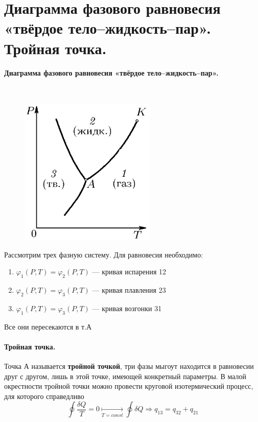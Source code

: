\section{\normalsize Диаграмма фазового равновесия «твёрдое тело--жидкость--пар». Тройная точка.}
\paragraph{Диаграмма фазового равновесия «твёрдое тело--жидкость--пар».}$\;$\\
\begin{minipage}{75mm}
	\begin{figure}[H]
		\includegraphics[width=65mm]{ris17.png}
	\end{figure}
\end{minipage}
\begin{minipage}{100mm}
	Рассмотрим трех фазную систему. Для равновесия необходимо:
	\begin{enumerate}[(1)]
		\item $\varphi_1(P,T)=\varphi_2(P,T)$ --- кривая испарения 12
		\item $\varphi_2(P,T)=\varphi_3(P,T)$ --- кривая плавления 23
		\item $\varphi_1(P,T)=\varphi_3(P,T)$ --- кривая возгонки 31
	\end{enumerate}
	Все они пересекаются в т.А
\end{minipage}
\paragraph{Тройная точка.}
Точка А называется \textbf{тройной точкой}, три фазы мыгоут находится в равновесии друг с другом, лишь в этой точке, имеющей конкретный параметры. В малой окрестности тройной точки можно провести круговой изотермический процесс, для которого справедливо
$$\oint\dfrac{\delta Q}{T}=0\underset{T=const}{\longmapsto}\oint\delta Q \Rightarrow q_\text{13}=q_\text{32}+q_\text{21}$$